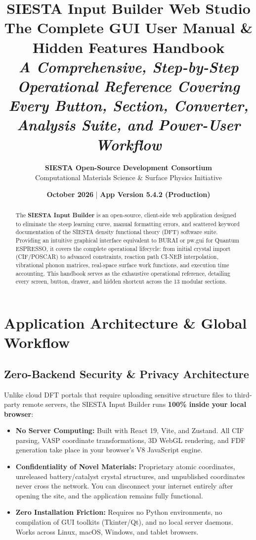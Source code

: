 \documentclass[11pt,a4paper]{article}
\title{\Huge \textbf{SIESTA Input Builder Web Studio}\\[0.3em]
\Large \textbf{The Complete GUI User Manual \& Hidden Features Handbook}\\[0.4em]
\large \textit{A Comprehensive, Step-by-Step Operational Reference Covering Every Button, Section, Converter, Analysis Suite, and Power-User Workflow}}
\author{\textbf{SIESTA Open-Source Development Consortium}\\
\small Computational Materials Science \& Surface Physics Initiative}
\date{\textbf{October 2026} \quad | \quad \textbf{App Version 5.4.2 (Production)}}
\begin{document}
\maketitle

\begin{abstract}
\noindent The \textbf{SIESTA Input Builder} is an open-source, client-side web application designed to eliminate the steep learning curve, manual formatting errors, and scattered keyword documentation of the SIESTA density functional theory (DFT) software suite. Providing an intuitive graphical interface equivalent to BURAI or pw.gui for Quantum ESPRESSO, it covers the complete operational lifecycle: from initial crystal import (CIF/POSCAR) to advanced constraints, reaction path CI-NEB interpolation, vibrational phonon matrices, real-space surface work functions, and execution time accounting. This handbook serves as the exhaustive operational reference, detailing every screen, button, drawer, and hidden shortcut across the 13 modular sections.
\end{abstract}

\tableofcontents
\newpage

\section{Application Architecture \& Global Workflow}

\subsection{Zero-Backend Security \& Privacy Architecture}
Unlike cloud DFT portals that require uploading sensitive structure files to third-party remote servers, the SIESTA Input Builder runs \textbf{100\% inside your local browser}:
\begin{itemize}[leftmargin=*]
 \item \textbf{No Server Computing:} Built with React 19, Vite, and Zustand. All CIF parsing, VASP coordinate transformations, 3D WebGL rendering, and FDF generation take place in your browser's V8 JavaScript engine.
 \item \textbf{Confidentiality of Novel Materials:} Proprietary atomic coordinates, unreleased battery/catalyst crystal structures, and unpublished coordinates never cross the network. You can disconnect your internet entirely after opening the site, and the application remains fully functional.
 \item \textbf{Zero Installation Friction:} Requires no Python environments, no compilation of GUI toolkits (Tkinter/Qt), and no local server daemons. Works across Linux, macOS, Windows, and tablet browsers.
\end{itemize}
\end{document}
